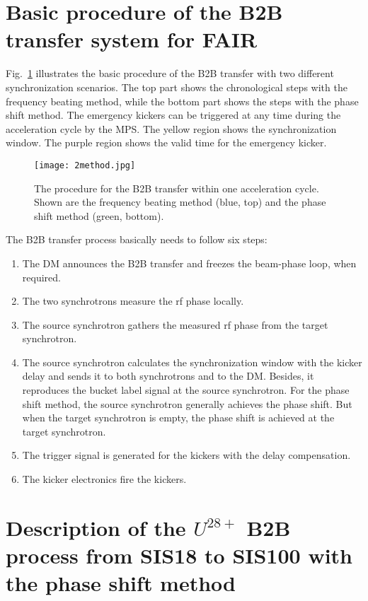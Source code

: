 \section{Basic procedure of the B2B transfer system for FAIR}

Fig.~\ref{2method} illustrates the basic procedure of the B2B transfer with two different synchronization scenarios. The top part shows the chronological steps with the frequency beating method, while the bottom part shows the steps with the phase shift method. The emergency kickers can be triggered at any time during the acceleration cycle by the MPS. The yellow region shows the synchronization window. The purple region shows the valid time for the emergency kicker. 
\begin{figure}[H]
   \centering   
   \texttt{[image: 2method.jpg]}
   \caption{The procedure for the B2B transfer within one acceleration cycle. Shown are the frequency beating method (blue, top) and the phase shift method (green, bottom).}
   \label{2method}
\end{figure}

The B2B transfer process basically needs to follow six steps:
\begin{enumerate}
\item The DM announces the B2B transfer and freezes the beam-phase loop, when required.
\item The two synchrotrons measure the rf phase locally.
\item The source synchrotron gathers the measured rf phase from the target synchrotron.
\item The source synchrotron calculates the synchronization window with the kicker delay and sends it to both synchrotrons and to the DM. Besides, it reproduces the bucket label signal at the source synchrotron.
For the phase shift method, the source synchrotron generally achieves the phase shift. But when the target synchrotron is empty, the phase shift is achieved at the target synchrotron.
\item The trigger signal is generated for the kickers with the delay compensation.
\item The kicker electronics fire the kickers.
\end{enumerate}

\section{Description of the $U^{28+}$ B2B process from SIS18 to SIS100 with the phase shift method}

